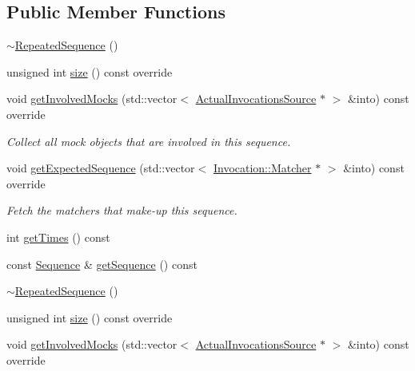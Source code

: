 \subsection*{Public Member Functions}
\begin{DoxyCompactItemize}
\item 
\mbox{\hyperlink{classfakeit_1_1RepeatedSequence_aa45714780e496cf02e8e35f27de5b617}{$\sim$\+Repeated\+Sequence}} ()
\item 
unsigned int \mbox{\hyperlink{classfakeit_1_1RepeatedSequence_a64d52ac14ca69a34e8188e856e6b51a6}{size}} () const override
\item 
void \mbox{\hyperlink{classfakeit_1_1RepeatedSequence_a4271add0945bdf443562df683e77777d}{get\+Involved\+Mocks}} (std\+::vector$<$ \mbox{\hyperlink{structfakeit_1_1ActualInvocationsSource}{Actual\+Invocations\+Source}} $\ast$ $>$ \&into) const override
\begin{DoxyCompactList}\small\item\em Collect all mock objects that are involved in this sequence. \end{DoxyCompactList}\item 
void \mbox{\hyperlink{classfakeit_1_1RepeatedSequence_a65b5f62fe0ba9da31b99f28c1a2e53f2}{get\+Expected\+Sequence}} (std\+::vector$<$ \mbox{\hyperlink{structfakeit_1_1Invocation_1_1Matcher}{Invocation\+::\+Matcher}} $\ast$ $>$ \&into) const override
\begin{DoxyCompactList}\small\item\em Fetch the matchers that make-\/up this sequence. \end{DoxyCompactList}\item 
int \mbox{\hyperlink{classfakeit_1_1RepeatedSequence_a08eba3d6b4d7740e6a999a75f142948c}{get\+Times}} () const
\item 
const \mbox{\hyperlink{classfakeit_1_1Sequence}{Sequence}} \& \mbox{\hyperlink{classfakeit_1_1RepeatedSequence_ad85825e1b9a47002d468c85f822d7f5e}{get\+Sequence}} () const
\item 
\mbox{\hyperlink{classfakeit_1_1RepeatedSequence_aa45714780e496cf02e8e35f27de5b617}{$\sim$\+Repeated\+Sequence}} ()
\item 
unsigned int \mbox{\hyperlink{classfakeit_1_1RepeatedSequence_a64d52ac14ca69a34e8188e856e6b51a6}{size}} () const override
\item 
void \mbox{\hyperlink{classfakeit_1_1RepeatedSequence_a4271add0945bdf443562df683e77777d}{get\+Involved\+Mocks}} (std\+::vector$<$ \mbox{\hyperlink{structfakeit_1_1ActualInvocationsSource}{Actual\+Invocations\+Source}} $\ast$ $>$ \&into) const override

\end{DoxyCompactItemize}
